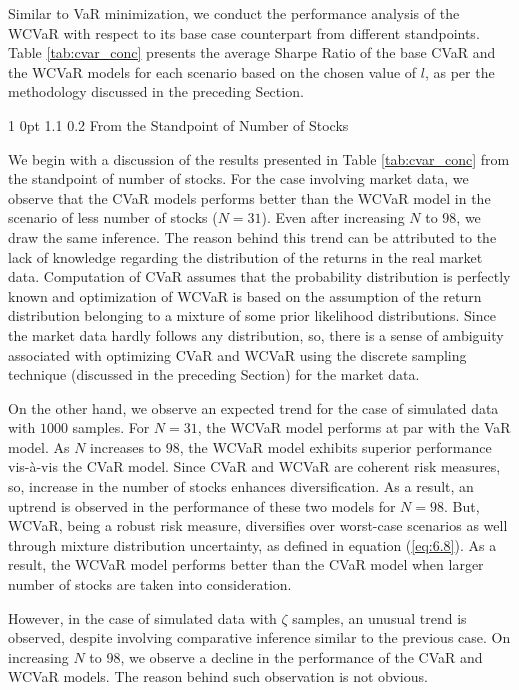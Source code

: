 \documentclass[12pt]{article}
\makeatletter
\numberwithin{equation}{section}
\renewcommand{\subsubsection}{
  \@startsection
  {subsubsection}%
  {1}%
  {0pt}%
  {1.1\baselineskip}%
  {0.2\baselineskip}%
  {\sc \centering}%
}
\makeatother
\begin{document}
Similar to VaR minimization, we conduct the performance analysis of the WCVaR with respect to its base case counterpart from different standpoints. Table \ref{tab:cvar_conc} presents the average Sharpe Ratio of the base CVaR and the WCVaR models for each scenario based on the chosen value of $l$, as per the methodology discussed in the preceding Section.

\subsubsection{From the Standpoint of Number of Stocks}

We begin with a discussion of the results presented in Table \ref{tab:cvar_conc} from the standpoint of number of stocks. For the case involving market data, we observe that the CVaR models performs better than the WCVaR model in the scenario of less number of stocks ($N=31$). Even after increasing $N$ to 98, we draw the same inference. The reason behind this trend can be attributed to the lack of knowledge regarding the distribution of the returns in the real market data. Computation of CVaR assumes that the probability distribution is perfectly known and optimization of WCVaR is based on the assumption of the return distribution belonging to a mixture of some prior likelihood distributions. Since the market data hardly follows any distribution, so, there is a sense of ambiguity associated with optimizing CVaR and WCVaR using the discrete sampling technique (discussed in the preceding Section) for the market data.

On the other hand, we observe an expected trend for the case of simulated data with $1000$ samples. For $N=31$, the WCVaR model performs at par with the VaR model. As $N$ increases to $98$, the WCVaR model exhibits superior performance vis-\`a-vis the CVaR model. Since CVaR and WCVaR are coherent risk measures, so, increase in the number of stocks enhances diversification. As a result, an uptrend is observed in the performance of these two models for $N=98$. But, WCVaR, being a robust risk measure, diversifies over worst-case scenarios as well through mixture distribution uncertainty, as defined in equation (\ref{eq:6.8}). As a result, the WCVaR model performs better than the CVaR model when larger number of stocks are taken into consideration.

However, in the case of simulated data with $\zeta$ samples, an unusual trend is observed, despite involving comparative inference similar to the previous case. On increasing $N$ to 98, we observe a decline in the performance of the CVaR and WCVaR models. The reason behind such observation is not obvious.
\end{document}
